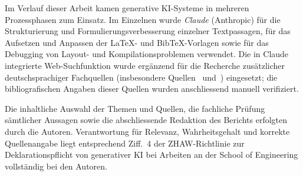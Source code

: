 Im Verlauf dieser Arbeit kamen generative KI-Systeme in mehreren Prozessphasen zum Einsatz. Im Einzelnen wurde \emph{Claude} (Anthropic) für die Strukturierung und Formulierungsverbesserung einzelner Textpassagen, für das Aufsetzen und Anpassen der \LaTeX- und BibTeX-Vorlagen sowie für das Debugging von Layout- und Kompilationsproblemen verwendet. Die in Claude integrierte Web-Suchfunktion wurde ergänzend für die Recherche zusätzlicher deutschsprachiger Fachquellen (insbesondere Quellen~\cite{MeierStormer2018} und~\cite{ESTV2022}) eingesetzt; die bibliografischen Angaben dieser Quellen wurden anschliessend manuell verifiziert.

Die inhaltliche Auswahl der Themen und Quellen, die fachliche Prüfung sämtlicher Aussagen sowie die abschliessende Redaktion des Berichts erfolgten durch die Autoren. Verantwortung für Relevanz, Wahrheitsgehalt und korrekte Quellenangabe liegt entsprechend Ziff.~4 der ZHAW-Richtlinie zur Deklarationspflicht von generativer KI bei Arbeiten an der School of Engineering vollständig bei den Autoren.
